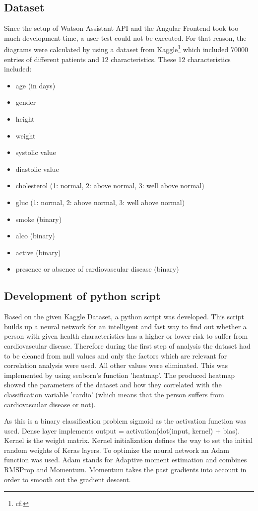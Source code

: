 \subsection{Dataset}
Since the setup of Watson Assistant API and the Angular Frontend took too much development time, a user test could not be executed. For that reason, the diagrams were calculated by using a dataset from Kaggle\footnote{cf.\autocite{kaggle}} which included 70000 entries of different patients and 12 characteristics. These 12 characteristics included:
\begin{itemize}
\setlength\itemsep{-0.5em}
  \item age (in days)
  \item gender
  \item height
  \item weight
  \item systolic value
  \item diastolic value
  \item cholesterol (1: normal, 2: above normal, 3: well above normal)
  \item gluc (1: normal, 2: above normal, 3: well above normal)
  \item smoke (binary)
  \item alco (binary)
  \item active (binary)
  \item presence or absence of cardiovascular disease (binary) 
\end{itemize}  

\subsection{Development of python script}

Based on the given Kaggle Dataset, a python script was developed. This script builds up a neural network for an intelligent and fast way to find out whether a person with given health characteristics has a higher or lower risk to suffer from cardiovascular disease.
Therefore during the first step of analysis the dataset had to be cleaned from null values and only the factors which are relevant for correlation analysis were used. All other values were eliminated. This was implemented by using seaborn's function 'heatmap'. The produced heatmap showed the parameters of the dataset and how they correlated with the classification variable 'cardio' (which means that the person suffers from cardiovascular disease or not).

As this is a binary classification problem sigmoid as the activation function was used.
Dense layer implements output = activation(dot(input, kernel) + bias). Kernel is the weight matrix. Kernel initialization defines the way to set the initial random weights of Keras layers.
To optimize the neural network an Adam function was used. Adam stands for Adaptive moment estimation and combines RMSProp and Momentum. Momentum takes the past gradients into account in order to smooth out the gradient descent.


